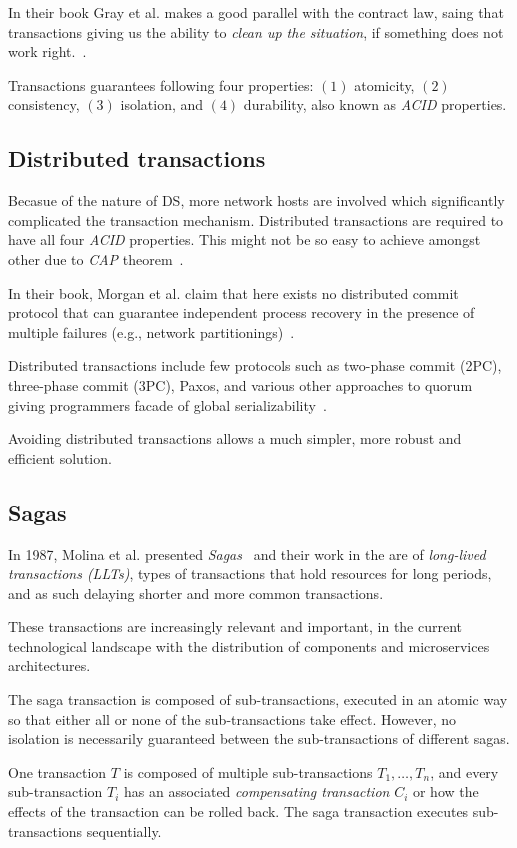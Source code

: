 In their book Gray et al. makes a good parallel with the contract law, saing that transactions giving us the ability to \emph{clean up the situation}, if something does not work right.~\cite{GrayR93}.

Transactions guarantees following four properties: $(1)$ atomicity, $(2)$ consistency, $(3)$ isolation, and $(4)$ durability, also known as \emph{ACID} properties. 
%
%
\subsection{Distributed transactions}\label{sec:distributed_transactions}
%
Becasue of the nature of DS, more network hosts are involved which significantly complicated the transaction mechanism. Distributed transactions are required to have all four \emph{ACID} properties. This might not be so easy to achieve amongst other due to \emph{CAP} theorem~\pageref{lab:cap}. 

In their book, Morgan et al. claim that here exists no distributed commit protocol that can guarantee independent process recovery in the presence of multiple failures (e.g., network partitionings)~\cite{WeikumV2002}.

Distributed transactions include few protocols such as two-phase commit (2PC), three-phase commit (3PC), Paxos, and various other approaches to quorum giving programmers facade of global serializability~\cite{Helland07}. 

Avoiding distributed transactions allows a much simpler, more robust and efficient solution.
%
%
\subsection{Sagas}\label{sec:sagas}
%
In 1987, Molina et al. presented \emph{Sagas}~\cite{Garcia-MolinaS87} and their work in the are of \emph{long-lived transactions (LLTs)}, types of transactions that hold resources for long periods, and as such delaying shorter and more common transactions. 

These transactions are increasingly relevant and important, in the current technological landscape with the distribution of components and microservices architectures.

The saga transaction is composed of sub-transactions, executed in an atomic way so that either all or none of the sub-transactions take effect. However, no isolation is necessarily guaranteed between the sub-transactions of different sagas.

One transaction $T$ is composed of multiple sub-transactions $T_1,\ldots,T_n$, and every sub-transaction $T_i$ has an associated \emph{compensating transaction} $C_i$ or how the effects of the transaction can be rolled back. The saga transaction executes sub-transactions sequentially.

